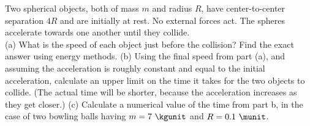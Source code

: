 Two spherical objects, both of mass $m$ and radius $R$, have
center-to-center separation $4R$ and are initially at rest. No external 
forces act. The
spheres accelerate towards one another until they collide.\\
%
(a) What is the speed of each object just before the collision?
Find the exact answer using energy methods.\answercheck\hwendpart
%
(b) Using the final speed from part (a), and
assuming the acceleration is roughly constant and equal to the
initial acceleration, calculate an upper limit on the time it takes
for the two objects to collide. (The actual time will be shorter,
because the acceleration increases as they get closer.)\answercheck\hwendpart
%
(c) Calculate a numerical value of the time from part b, in the
case of two bowling balls having $m = 7\ \kgunit$ and $R = 0.1\ \munit$.\answercheck\hwendpart
